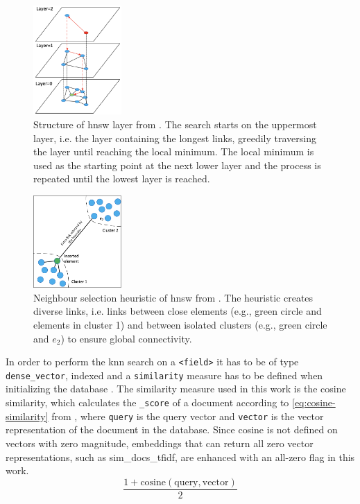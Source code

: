 \begin{figure}[htp] %
    \centering
    \includegraphics[width=0.3\textwidth]{images/HNSW-layer.png}
    \caption{Structure of \ac{hnsw} layer from \cite{Elasticsearch-kNN-HNSW}.
    The search starts on the uppermost layer, i.e. the layer containing the longest links, greedily traversing the layer until reaching the local minimum.
    The local minimum is used as the starting point at the next lower layer and the process is repeated until the lowest layer is reached.
    }
    \label{fig:hnsw-layer}
\end{figure}

\begin{figure}[htp] %
    \centering
    \includegraphics[width=0.3\textwidth]{images/HNSW-neighbour-selection-heuristic.png}
    \caption{Neighbour selection heuristic of \ac{hnsw} from \cite{Elasticsearch-kNN-HNSW}.
    The heuristic creates diverse links, i.e. links between close elements (e.g., green circle and elements in cluster 1) 
    and between isolated clusters (e.g., green circle and $e_2$) to ensure global connectivity.
    }
    \label{fig:hnsw-heuristic}
\end{figure}

In order to perform the \ac{knn} search on a \texttt{<field>} it has to be of type \texttt{dense\_vector}, indexed and a \texttt{similarity} measure has to be defined when initializing the database \cite{Elasticsearch-knn}.
The similarity measure used in this work is the cosine similarity, which calculates the \texttt{\_score} of a document according to \autoref{eq:cosine-similarity} from \cite{Elasticsearch-kNN-similarity}, 
where \texttt{query} is the query vector and \texttt{vector} is the vector representation of the document in the database.
Since cosine is not defined on vectors with zero magnitude, embeddings that can return all zero vector representations, such as sim\_docs\_tfidf, are enhanced with an all-zero flag in this work.
\begin{equation}
    \frac{1 + \text{cosine}(\text{query}, \text{vector})}{2}
    \label{eq:cosine-similarity}
\end{equation}

